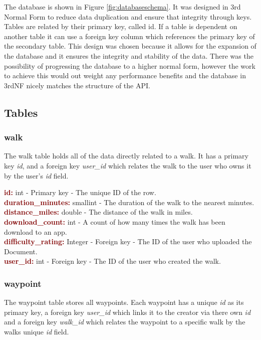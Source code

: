 \documentclass[11pt,a4paper]{report}
\begin{document}
The database is shown in Figure \ref{fig:databaseschema}. It was designed in 3rd Normal Form to reduce data duplication and ensure that integrity through keys. Tables are related by their primary key, called id. If a table is dependent on another table it can use a foreign key column which references the primary key of the secondary table. This design was chosen because it allows for the expansion of the database and it ensures the integrity and stability of the data. There was the possibility of progressing the database to a higher normal form, however the work to achieve this would out weight any performance benefits and the database in 3rdNF nicely matches the structure of the API.

\subsection{Tables}

\subsubsection{walk}
The walk table holds all of the data directly related to a walk. It has a primary key \textit{id}, and a foreign key \textit{user\_id} which relates the walk to the user who owns it by the user's \textit{id} field. 

\textbf{\textcolor{Maroon}{id:}} int - Primary key - The unique ID of the row. \\
\textbf{\textcolor{Maroon}{duration\_minutes:}} smallint -  The duration of the walk to the nearest minutes.\\
\textbf{\textcolor{Maroon}{distance\_miles:}} double - The distance of the walk in miles.\\
\textbf{\textcolor{Maroon}{download\_count:}} int - A count of how many times the walk has been download to an app. \\
\textbf{\textcolor{Maroon}{difficulty\_rating:}} Integer - Foreign key - The ID of the user who uploaded the Document. \\
\textbf{\textcolor{Maroon}{user\_id:}} int - Foreign key - The ID of the user who created the walk.

\subsubsection{waypoint}
The waypoint table stores all waypoints. Each waypoint has a unique \textit{id} as its primary key, a foreign key \textit{user\_id} which links it to the creator via there own \textit{id} and a foreign key \textit{walk\_id} which relates the waypoint to a specific walk by the walks unique \textit{id} field. 
\end{document}
